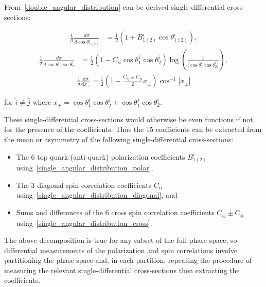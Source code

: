 From~\ref{double_angular_distribution} can be derived single-differential cross-sections:
\begin{linenomath*}
\begin{align}
\frac{1}{\sigma} \frac{d \sigma}{d \cos \theta_{1(2)}^i} & =\frac{1}{2}\left(1+B_{1(2)}^{i} \cos \theta_{1(2)}^i\right),
\label{single_angular_distribution_polar}
\end{align}
\begin{align}
\frac{1}{\sigma} \frac{d \sigma}{d \cos \theta_1^i \cos \theta_2^i} & =\frac{1}{2}\left(1 - C_{ii} \cos \theta_1^i \cos \theta_2^i\right) \log \left(\frac{1}{\left \vert \cos \theta_1^i \cos \theta_2^i\right \vert}\right),
\label{single_angular_distribution_diagonal}
\end{align}
\begin{align}
\frac{1}{\sigma} \frac{\mathrm{d} \sigma}{\mathrm{d} x_{\pm}} = \frac{1}{2} \left(1-\frac{C_{ij} \pm C_{ji}}{2} {x_{\pm}} \right) \cos ^{-1} \left \vert x_{\pm} \right \vert
\label{single_angular_distribution_cross}
\end{align}
\end{linenomath*}
\begin{center}
for $\hat{i} \neq \hat{j}$ where $x_{\pm} = \cos \theta_1^i \cos \theta_2^j \pm \cos \theta_1^j \cos \theta_2^i$.
\end{center}
These single-differential cross-sections would otherwise be even functions if not for the presence of the coefficients.
Thus the 15 coefficients can be extracted from the mean or asymmetry of the following single-differential cross-sections:
\begin{itemize}
\item The 6 top quark (anti-quark) polarization coefficients $B_{1(2)}^{i}$ using~\ref{single_angular_distribution_polar},
\item  The 3 diagonal spin correlation coefficients $C_{ii}$ using~\ref{single_angular_distribution_diagonal}, and
\item  Sums and differences of the 6 cross spin correlation coefficients $C_{ij} \pm C_{ji}$ using~\ref{single_angular_distribution_cross}.
\end{itemize}

The above decomposition is true for any subset of the full phase space, so differential measurements of the polarization and spin correlations involve partitioning the phase space and, in each partition, repeating the procedure of measuring the relevant single-differential cross-sections then extracting the coefficients.

